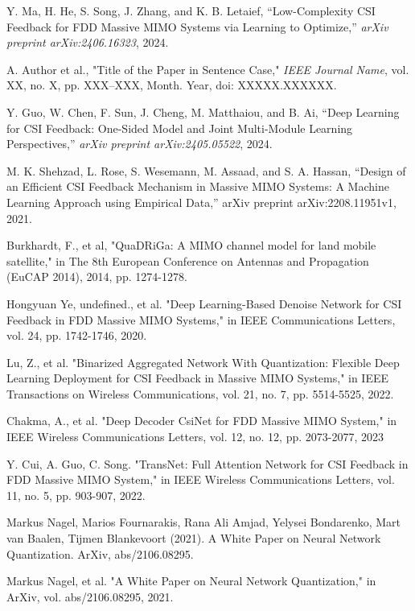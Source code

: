 \documentclass[lettersize,journal]{IEEEtran}
\begin{document}
\begin{thebibliography}{00}
	Y. Ma, H. He, S. Song, J. Zhang, and K. B. Letaief, 
	``Low-Complexity CSI Feedback for FDD Massive MIMO Systems via Learning to Optimize,'' 
	\textit{arXiv preprint arXiv:2406.16323}, 2024.

	A. Author et al., 
	"Title of the Paper in Sentence Case," 
	\textit{IEEE Journal Name}, 
	vol. XX, no. X, 
	pp. XXX--XXX, 
	Month. Year, 
	doi: XXXXX.XXXXXX.

	Y. Guo, W. Chen, F. Sun, J. Cheng, M. Matthaiou, and B. Ai, 
	``Deep Learning for CSI Feedback: One-Sided Model and Joint Multi-Module Learning Perspectives,'' 
	\textit{arXiv preprint arXiv:2405.05522}, 
	2024.

	M. K. Shehzad, L. Rose, S. Wesemann, M. Assaad, and S. A. Hassan, 
	``Design of an Efficient CSI Feedback Mechanism in Massive MIMO Systems: A Machine Learning Approach using Empirical Data,'' 
	arXiv preprint arXiv:2208.11951v1, 2021.


	Burkhardt, F., et al, "QuaDRiGa: A MIMO channel model for land mobile satellite," in The 8th European Conference on Antennas and Propagation (EuCAP 2014), 2014, pp. 1274-1278.
	
	Hongyuan Ye, undefined., et al. "Deep Learning-Based Denoise Network for CSI Feedback in FDD Massive MIMO Systems," in IEEE Communications Letters, vol. 24, pp. 1742-1746, 2020.
	
	Lu, Z., et al. "Binarized Aggregated Network With Quantization: Flexible Deep Learning Deployment for CSI Feedback in Massive MIMO Systems," in IEEE Transactions on Wireless Communications, vol. 21, no. 7, pp. 5514-5525, 2022.
	
	Chakma, A., et al. "Deep Decoder CsiNet for FDD Massive MIMO System," in IEEE Wireless Communications Letters, vol. 12, no. 12, pp. 2073-2077, 2023
	
	Y. Cui, A. Guo, C. Song. "TransNet: Full Attention Network for CSI Feedback in FDD Massive MIMO System," in IEEE Wireless Communications Letters, vol. 11, no. 5, pp. 903-907, 2022.
	
	Markus Nagel, Marios Fournarakis, Rana Ali Amjad, Yelysei Bondarenko, Mart van Baalen, Tĳmen Blankevoort (2021). A White Paper on Neural Network Quantization. ArXiv, abs/2106.08295.
	
	Markus Nagel, et al. "A White Paper on Neural Network Quantization," in ArXiv, vol. abs/2106.08295, 2021.
	

\end{thebibliography}
\end{document}
